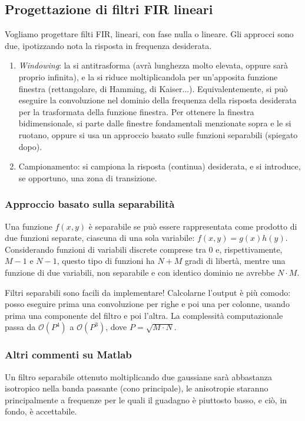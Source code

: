 \documentclass[a4paper,11pt]{article}
\begin{document}
\subsection{Progettazione di filtri FIR lineari}
Vogliamo progettare filti FIR, lineari, con fase nulla o lineare.
Gli approcci sono due, ipotizzando nota la risposta in frequenza desiderata.
\begin{enumerate}
    \item \textit{Windowing}: la si antitrasforma (avrà lunghezza molto elevata, oppure sarà proprio infinita), e la si riduce moltiplicandola per
    un'apposita funzione finestra (rettangolare, di Hamming, di Kaiser...). Equivalentemente, si può eseguire la convoluzione nel dominio della frequenza della risposta desiderata per la trasformata della funzione
    finestra. Per ottenere la finestra bidimensionale, si parte dalle finestre fondamentali menzionate sopra e le si ruotano, oppure si usa un approccio
    basato sulle funzioni separabili (spiegato dopo).
    \item Campionamento: si campiona la risposta (continua) desiderata, e si introduce, se opportuno, una zona di transizione.
\end{enumerate}

\subsubsection{Approccio basato sulla separabilità}
Una funzione $f(x,y)$ è separabile se può essere rappresentata come prodotto di due funzioni separate, ciascuna di una sola variabile:
$f(x,y)=g(x)h(y)$. Considerando funzioni di variabili discrete comprese tra 0 e, rispettivamente, $M-1$ e $N-1$, questo tipo di funzioni ha
$N+M$ gradi di libertà, mentre una funzione di due variabili, non separabile e con identico dominio ne avrebbe $N \cdot M$.
\par
Filtri separabili sono facili da implementare! Calcolarne l'output è più comodo: posso eseguire prima una convoluzione per righe e poi una per colonne,
usando prima una componente del filtro e poi l'altra. La complessità computazionale passa da $\mathcal{O}(P^4)$ a $\mathcal{O}(P^3)$,
dove $P = \sqrt{M \cdot N}$.

\subsubsection{Altri commenti su Matlab}
Un filtro separabile ottenuto moltiplicando due gaussiane sarà abbastanza isotropico nella banda passante (cono principale), le anisotropie
staranno principalmente a frequenze per le quali il guadagno è piuttosto basso, e ciò, in fondo, è accettabile.
\end{document}
